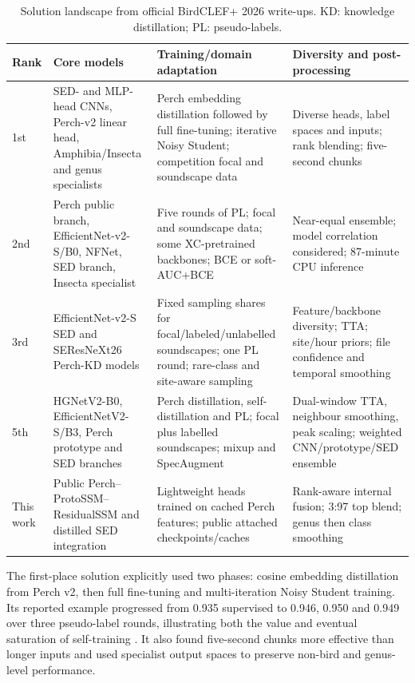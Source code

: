 \documentclass[10pt,a4paper]{article}
\begin{document}
\begin{table}[H]
\centering\small
\caption{Solution landscape from official BirdCLEF+ 2026 write-ups. KD: knowledge distillation; PL: pseudo-labels.}
\label{tab:landscape}
\begin{tabularx}{\textwidth}{p{1.0cm}YYY}\toprule
Rank & Core models & Training/domain adaptation & Diversity and post-processing\\\midrule
1st \cite{first2026writeup} & SED- and MLP-head CNNs, Perch-v2 linear head, Amphibia/Insecta and genus specialists & Perch embedding distillation followed by full fine-tuning; iterative Noisy Student; competition focal and soundscape data & Diverse heads, label spaces and inputs; rank blending; five-second chunks\\
2nd \cite{second2026writeup} & Perch public branch, EfficientNet-v2-S/B0, NFNet, SED branch, Insecta specialist & Five rounds of PL; focal and soundscape data; some XC-pretrained backbones; BCE or soft-AUC+BCE & Near-equal ensemble; model correlation considered; 87-minute CPU inference\\
3rd \cite{third2026writeup} & EfficientNet-v2-S SED and SEResNeXt26 Perch-KD models & Fixed sampling shares for focal/labeled/unlabelled soundscapes; one PL round; rare-class and site-aware sampling & Feature/backbone diversity; TTA; site/hour priors; file confidence and temporal smoothing\\
5th \cite{fifth2026writeup} & HGNetV2-B0, EfficientNetV2-S/B3, Perch prototype and SED branches & Perch distillation, self-distillation and PL; focal plus labelled soundscapes; mixup and SpecAugment & Dual-window TTA, neighbour smoothing, peak scaling; weighted CNN/prototype/SED ensemble\\
This work & Public Perch--ProtoSSM--ResidualSSM and distilled SED integration & Lightweight heads trained on cached Perch features; public attached checkpoints/caches & Rank-aware internal fusion; 3:97 top blend; genus then class smoothing\\\bottomrule
\end{tabularx}
\end{table}

The first-place solution explicitly used two phases: cosine embedding distillation from Perch v2, then full fine-tuning and multi-iteration Noisy Student training. Its reported example progressed from 0.935 supervised to 0.946, 0.950 and 0.949 over three pseudo-label rounds, illustrating both the value and eventual saturation of self-training \cite{first2026writeup}. It also found five-second chunks more effective than longer inputs and used specialist output spaces to preserve non-bird and genus-level performance.
\end{document}
